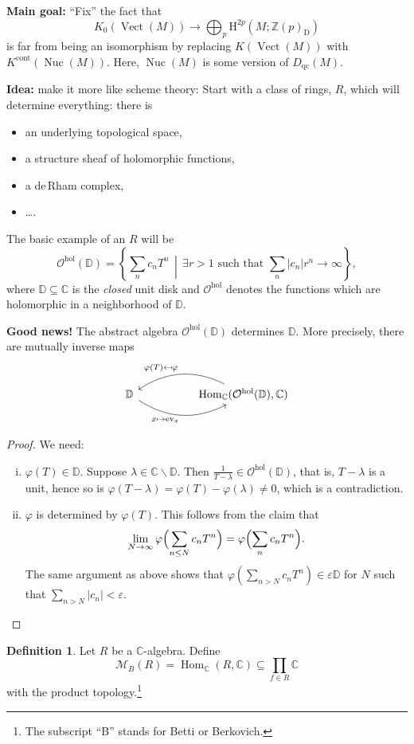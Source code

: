 \documentclass[draft]{amsart}
\newcommand{\ZZ}{\mathbb{Z}}
\newcommand{\DD}{\mathbb{D}}
\newcommand{\CC}{\mathbb{C}}
\renewcommand{\H}{\mathrm{H}}
\newcommand{\D}{\mathrm{D}}
\renewcommand{\O}{\mathcal{O}}
\newcommand{\set}[2]{\left\{#1\,\middle|\,#2\right\}}
\newcommand{\cat}[1]{\mathcal{#1}}
\renewcommand{\setminus}{\smallsetminus}
\DeclareMathOperator{\Hom}{Hom}
\DeclareMathOperator{\ev}{ev}
\DeclareMathOperator{\Nuc}{Nuc}
\DeclareMathOperator{\Vect}{Vect}
\theoremstyle{definition}
\newtheorem{defn}[thm]{Definition}
\begin{document}
\textbf{Main goal:} \enquote{Fix} the fact that
\[
K_0(\Vect(M)) \to \bigoplus_p \H^{2p}(M; \ZZ(p)_\D)
\]
is far from being an isomorphism by replacing $K(\Vect(M))$ with $K^{\mathrm{cont}}(\Nuc(M))$. Here, $\Nuc(M)$ is some version of $D_{\mathrm{qc}}(M)$.

\textbf{Idea:} make it more like scheme theory: Start with a class of rings, $R$, which will determine everything: there is 
\begin{itemize}
\item an underlying topological space,
\item a structure sheaf of holomorphic functions,
\item a de\,Rham complex,
\item \ldots.
\end{itemize}

The basic example of an $R$ will be
\[
\O^{\mathrm{hol}}(\DD) = \set{\sum_n c_n T^n}{\text{$\exists r>1$ such that $\sum_n \lvert c_n\rvert r^n \to \infty$}},
\]
where $\DD \subseteq \CC$ is the \emph{closed} unit disk and $\O^{\mathrm{hol}}$ denotes the functions which are holomorphic in a neighborhood of $\DD$.

\textbf{Good news!} The abstract algebra $\O^{\mathrm{hol}}(\DD)$ determines $\DD$. More precisely, there are mutually inverse maps
\[
\begin{tikzcd}[column sep=5em]
\DD \ar[r,bend right,"x\mapsto \ev_x"'] & \Hom_{\CC}(\O^{\mathrm{hol}}(\DD), \CC) \ar[l,bend right, "\varphi(T) \mapsfrom \varphi"'] 
\end{tikzcd}
\]
\begin{proof}
We need: 
\begin{enumerate}[(i)]
\item $\varphi(T) \in \DD$. Suppose $\lambda\in \CC\setminus \DD$. Then $\frac1{T-\lambda} \in \O^{\mathrm{hol}}(\DD)$, that is, $T-\lambda$ is a unit, hence so is $\varphi(T-\lambda) = \varphi(T) - \varphi(\lambda) \neq 0$, which is a contradiction.

\item $\varphi$ is determined by $\varphi(T)$. This follows from the claim that
\[
\lim_{N\to \infty} \varphi\Bigl( \sum_{n\le N} c_n T^n\Bigr) = \varphi\Bigl(\sum_n c_n T^n\Bigr).
\]
The same argument as above shows that $\varphi(\sum_{n>N} c_nT^n) \in \varepsilon \DD$ for $N$ such that $\sum_{n>N} \lvert c_n\rvert <\varepsilon$.
\end{enumerate}
\end{proof}

\begin{defn}
Let $R$ be a $\CC$-algebra. Define
\[
\cat M_B(R) = \Hom_{\CC}(R, \CC) \subseteq \prod_{f\in R} \CC
\]
with the product topology.\footnote{The subscript \enquote{B} stands for Betti or Berkovich.}
\end{defn}
\end{document}
